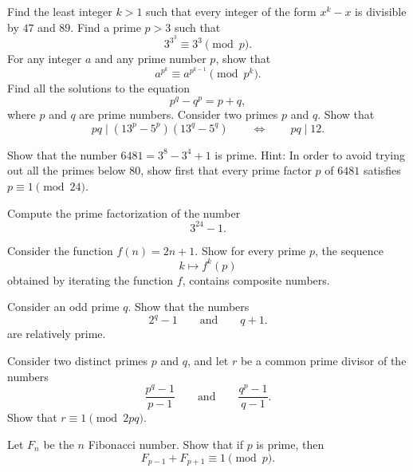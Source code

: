 \begin{challenge}
  \exercise Find the least integer $k>1$ such that every integer of the form $x^k-x$ is divisible by $47$ and $89$.
  \exercise Find a prime $p>3$ such that
  \begin{equation*}
    3^{3^3}\equiv 3^3\pmod{p}.
  \end{equation*}
  \exercise For any integer $a$ and any prime number $p$, show that
  \begin{equation*}
    a^{p^k} \equiv a^{p^{k-1}} \pmod{p^k}.
  \end{equation*}
  \exercise Find all the solutions to the equation
  \begin{equation*}
    p^q-q^p=p+q,
  \end{equation*}
  where $p$ and $q$ are prime numbers.
  \exercise Consider two primes $p$ and $q$. Show that
  \begin{equation*}
    pq\mid (13^p-5^p)(13^q-5^q)\qquad\Leftrightarrow\qquad pq\mid 12.
  \end{equation*}
  \exercise
  \begin{subexenum}
  \item Show that the number $6481=3^8-3^4+1$ is prime. Hint: In order to avoid trying out all the primes below $80$, show first that every prime factor $p$ of $6481$ satisfies $p\equiv 1\pmod{24}$.
  \item Compute the prime factorization of the number
    \begin{equation*}
      3^{24}-1.
    \end{equation*}
  \end{subexenum}
  \exercise Consider the function $f(n)=2n+1$. Show for every prime $p$, the sequence
  \begin{equation*}
    k\mapsto f^k(p)
  \end{equation*}
  obtained by iterating the function $f$, contains composite numbers.
  \exercise \label{exercise:prime-divisors-feit-thompson-conjecture}
  \begin{subexenum}
  \item Consider an odd prime $q$. Show that the numbers
    \begin{equation*}
      2^q-1 \qquad\text{and}\qquad q+1.
    \end{equation*}
    are relatively prime.
  \item Consider two distinct primes $p$ and $q$, and let $r$ be a common prime divisor of the numbers
  \begin{equation*}
    \frac{p^q-1}{p-1}\qquad\text{and}\qquad\frac{q^p-1}{q-1}.
  \end{equation*}
  Show that $r\equiv 1\pmod{2pq}$.  
  \end{subexenum}
  \exercise Let $F_n$ be the $n$\supth{} Fibonacci number. Show that if $p$ is prime, then
  \begin{equation*}
    F_{p-1}+F_{p+1}\equiv 1\pmod{p}.
  \end{equation*}
\end{challenge}

